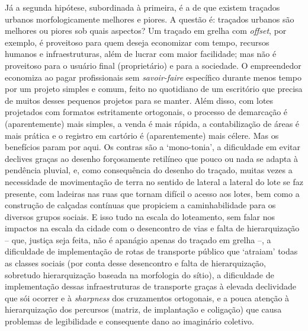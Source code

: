 \documentclass[twoside, 12pt]{book}
\begin{document}
        Já a segunda hipótese, subordinada à primeira, é a de que existem traçados urbanos morfologicamente melhores e piores. A questão é: traçados urbanos são melhores ou piores sob quais aspectos? Um traçado em grelha com \textit{offset}, por exemplo, é proveitoso para quem deseja economizar com tempo, recursos humanos e infraestruturas, além de lucrar com maior facilidade; mas não é proveitoso para o usuário final (proprietário) e para a sociedade. O empreendedor economiza ao pagar profissionais sem \textit{savoir-faire} específico durante menos tempo por um projeto simples e comum, feito no quotidiano de um escritório que precisa de muitos desses pequenos projetos para se manter. Além disso, com lotes projetados com formatos estritamente ortogonais, o processo de demarcação é (aparentemente) mais simples, a venda é mais rápida, a contabilização de áreas é mais prática e o registro em cartório é (aparentemente) mais célere. Mas os benefícios param por aqui. Os contras são a ‘mono-tonia’, a dificuldade em evitar declives graças ao desenho forçosamente retilíneo que pouco ou nada se adapta à pendência pluvial, e, como consequência do desenho do traçado, muitas vezes a necessidade de movimentação de terra no sentido de lateral a lateral do lote se faz presente, com ladeiras nas ruas que tornam difícil o acesso aos lotes, bem como a construção de calçadas contínuas que propiciem a caminhabilidade para os diversos grupos sociais. E isso tudo na escala do loteamento, sem falar nos impactos na escala da cidade com o desencontro de vias e falta de hierarquização – que, justiça seja feita, não é apanágio apenas do traçado em grelha –, a dificuldade de implementação de rotas de transporte público que ‘atraiam’ todas as classes sociais (por conta desse desencontro e falta de hierarquização, sobretudo hierarquização baseada na morfologia do sítio), a dificuldade de implementação dessas infraestruturas de transporte graças à elevada declividade que sói ocorrer e à \textit{sharpness} dos cruzamentos ortogonais, e a pouca atenção à hierarquização dos percursos (matriz, de implantação e coligação) que causa problemas de legibilidade e consequente dano ao imaginário coletivo.
\end{document}
